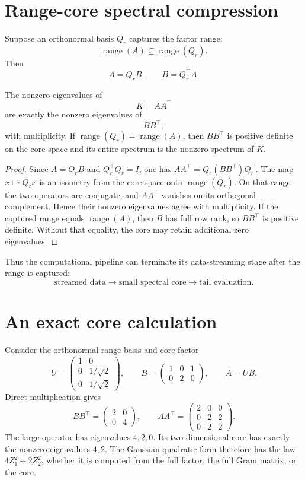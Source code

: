 \section{Range-core spectral compression}\label{sec:final-21}

Suppose an orthonormal basis \(Q_r\) captures the factor range:
\[
\operatorname{range}(A)\subseteq\operatorname{range}(Q_r).
\]
Then
\[
A=Q_rB,
\qquad
B=Q_r^\top A.
\]

\begin{theorem}\label{claim:final-21-1}
The nonzero eigenvalues of
\[
K=AA^\top
\]
are exactly the nonzero eigenvalues of
\[
BB^\top,
\]
with multiplicity. If $\operatorname{range}(Q_r)=\operatorname{range}(A)$,
then $BB^\top$ is positive definite on the core space and its entire spectrum
is the nonzero spectrum of $K$.
\end{theorem}

\begin{proof}
Since $A=Q_rB$ and $Q_r^\top Q_r=I$, one has
$AA^\top=Q_r(BB^\top)Q_r^\top$. The map $x\mapsto Q_rx$ is an isometry
from the core space onto $\operatorname{range}(Q_r)$. On that range the two
operators are conjugate, and $AA^\top$ vanishes on its orthogonal complement.
Hence their nonzero eigenvalues agree with multiplicity. If the captured
range equals $\operatorname{range}(A)$, then $B$ has full row rank, so
$BB^\top$ is positive definite. Without that equality, the core may retain
additional zero eigenvalues.
\end{proof}


Thus the computational pipeline can terminate its data-streaming stage after
the range is captured:
\[
\boxed{
\text{streamed data}
\to
\text{small spectral core}
\to
\text{tail evaluation}.
}
\]



\clearpage
\section{An exact core calculation}
Consider the orthonormal range basis and core factor
\[
U=\begin{pmatrix}1&0\\0&1/\sqrt2\\0&1/\sqrt2\end{pmatrix},
\qquad
B=\begin{pmatrix}1&0&1\\0&2&0\end{pmatrix},
\qquad A=UB.
\]
Direct multiplication gives
\[
BB^\top=\begin{pmatrix}2&0\\0&4\end{pmatrix},
\qquad
AA^\top=\begin{pmatrix}2&0&0\\0&2&2\\0&2&2\end{pmatrix}.
\]
The large operator has eigenvalues $4,2,0$. Its two-dimensional core has
exactly the nonzero eigenvalues $4,2$. The Gaussian quadratic form therefore
has the law $4Z_1^2+2Z_2^2$, whether it is computed from the full factor, the
full Gram matrix, or the core.

